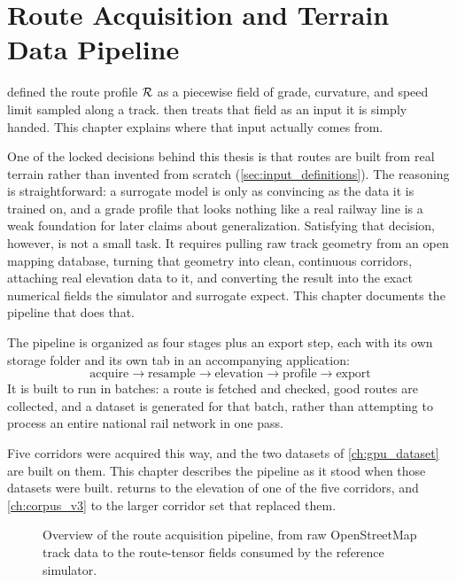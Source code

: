\chapter{Route Acquisition and Terrain Data Pipeline}
\label{ch:routes}

 defined the route profile $\mathcal{R}$ as a piecewise field of grade, curvature, and speed limit sampled along a track.  then treats that field as an input it is simply handed. This chapter explains where that input actually comes from.

One of the locked decisions behind this thesis is that routes are built from real terrain rather than invented from scratch (\cref{sec:input_definitions}). The reasoning is straightforward: a surrogate model is only as convincing as the data it is trained on, and a grade profile that looks nothing like a real railway line is a weak foundation for later claims about generalization. Satisfying that decision, however, is not a small task. It requires pulling raw track geometry from an open mapping database, turning that geometry into clean, continuous corridors, attaching real elevation data to it, and converting the result into the exact numerical fields the simulator and surrogate expect. This chapter documents the pipeline that does that.

The pipeline is organized as four stages plus an export step, each with its own storage folder and its own tab in an accompanying application:
\begin{equation*}
    \text{acquire} \rightarrow \text{resample} \rightarrow \text{elevation} \rightarrow \text{profile} \rightarrow \text{export}
\end{equation*}
It is built to run in batches: a route is fetched and checked, good routes are collected, and a dataset is generated for that batch, rather than attempting to process an entire national rail network in one pass.

Five corridors were acquired this way, and the two datasets of \cref{ch:gpu_dataset} are built on them. This chapter describes the pipeline as it stood when those datasets were built.  returns to the elevation of one of the five corridors, and \cref{ch:corpus_v3} to the larger corridor set that replaced them.

\begin{figure}[h]
\centering
\caption{Overview of the route acquisition pipeline, from raw OpenStreetMap track data to the route-tensor fields consumed by the reference simulator.}
\label{fig:route_pipeline_overview}
\end{figure}

